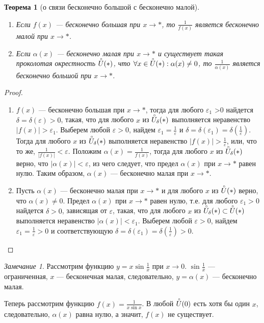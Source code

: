 \documentclass[a4paper,12pt]{article} %
\newtheorem{theorem}{Теорема}[section]
\theoremstyle{remark}
\newtheorem*{remark}{Замечание}
\theoremstyle{definition}
\begin{document}
\begin{theorem}[о связи бесконечно большой с бесконечно малой]\ 
	\begin{enumerate}
		\item Если $f(x)$ --- бесконечно большая при $x\to *$, то $\frac{1}{f(x)}$ является бесконечно малой при $x\to *$.
		\item Если $\alpha(x)$ --- бесконечно малая при $x \to *$ и существует такая проколотая окрестность $\accentset{\circ}{U}(*)$, что $\forall x \in  \accentset{\circ}{U}(*) : \alpha(x) \neq 0$, то $\frac{1}{\alpha(x)}$ является бесконечно большой при $x\to *$.
	\end{enumerate}		
\end{theorem}
\begin{proof}\
	\begin{enumerate}
		\item $f(x)$ --- бесконечно большая при $x \to *$, тогда для любого $\varepsilon_1$ >0 найдется $\delta=\delta(\varepsilon)>0$, такая, что для любого $x$ из $\accentset{\circ}{U}_\delta(*)$ выполняется неравенство $|f(x)|>\varepsilon_1$.
                Выберем любой $\varepsilon>0$, найдем $\varepsilon_1=\frac{1}{\varepsilon}$ и $\delta=\delta(\varepsilon_1)=\delta(\frac{1}{\varepsilon})$. Тогда для любого $x$ из $\accentset{\circ}{U}_\delta(*)$ выполняется неравенство $|f(x)|>\frac{1}{\varepsilon}$, или, что то же, $\frac{1}{|f(x)|} < \varepsilon$. Положим $\alpha(x) = \frac{1}{f(x)}$, тогда для любого $x$ из $\accentset{\circ}{U}_\delta(*)$ верно, что $|\alpha(x)| < \varepsilon$, из чего следует, что предел $\alpha(x)$ при $x\to *$ равен нулю. Таким образом, $\alpha(x)$ --- бесконечно малая при $x\to *$.
	\item Пусть $\alpha(x)$ --- бесконечно малая при $x\to *$ и для любого $x$ из $\accentset{\circ}{U}(*)$ верно, что $\alpha(x)\neq 0$. Предел $\alpha(x)$ при $x\to *$ равен нулю, т.е. для любого $\varepsilon_1>0$ найдется $\delta>0$, зависящая от $\varepsilon$, такая, что для любого $x$ из $\accentset{\circ}{U}_\delta(*)\subset \accentset{\circ}{U}(*)$ выполняется неравенство $|\alpha(x)|<\varepsilon_1$. Выберем любой $\varepsilon>0$, найдем $\varepsilon_1=\frac{1}{\varepsilon}>0$ и соответствующую $\delta=\delta(\varepsilon_1)=\delta(\frac{1}{\varepsilon})>0$. %
	\end{enumerate}	
\end{proof}

\begin{remark}
	Рассмотрим функцию $y=x\sin \frac{1}{x}$ при $x\to 0$. $\sin \frac{1}{x}$ --- ограниченная, $x$ --- бесконечная малая, следовательно, $y = \alpha(x)$ --- бесконечно малая.
	
	Теперь рассмотрим функцию $f(x) = \frac{1}{x \sin x}$. В любой $\accentset{\circ}{U}(0)$ есть хотя бы один $x$, следовательно, $\alpha(x)$ равна нулю, а значит, $f(x)$ не существует.
\end{remark}
\end{document}
